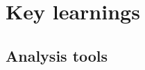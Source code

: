 \documentclass[9pt,bestpractices]{livecoms}
\begin{document}




\section{Key learnings}
\label{sec:key_learnings}

\subsection{Analysis tools}
\label{sec:analysis_tools}
\end{document}
